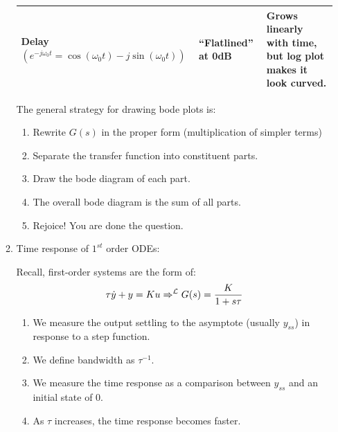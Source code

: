 \begin{enumerate}
\begin{enumerate}
\begin{table}[h]
\begin{tabular}{ | p{5cm} || p{6cm} | p{6cm} |}
                        Delay $ \left( e^{-j\omega_0t} = \cos(\omega_0 t) - j\sin(\omega_0 t) \right)$ &
                            ``Flatlined'' at 0dB &
                            Grows linearly with time, but log plot makes it look curved.
                            \\ \hline

                    \end{tabular}
                \end{table}

                The general strategy for drawing bode plots is:

                \begin{enumerate}
                    \item Rewrite $G(s)$ in the proper form (multiplication of simpler terms)
                    \item Separate the transfer function into constituent parts.
                    \item Draw the bode diagram of each part.
                    \item The overall bode diagram is the sum of all parts.
                    \item Rejoice! You are done the question.
                \end{enumerate}
            \item Time response of $1^{st}$ order ODEs:

                Recall, first-order systems are the form of:
                \begin{align*}
                    \tau \dot{y} + y = Ku &\Rightarrow^{\mathcal{L}} G(s) = \frac{K}{1+s\tau} \\
                \end{align*}

                \begin{enumerate}
                    \item We measure the output settling to the asymptote (usually $y_{ss}$) in response to a step function.

                    \item We define bandwidth as $\tau^{-1}$.

                    \item We measure the time response as a comparison between $y_{ss}$ and an initial state of $0$.

                    \item As $\tau$ increases, the time response becomes faster.


\end{enumerate}
\end{enumerate}
\end{enumerate}
